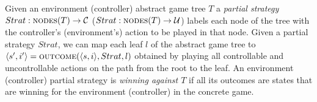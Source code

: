 Given an environment (controller) abstract game tree $T$ a \emph{partial
strategy} $Strat: \textsc{nodes}(T) \rightarrow \mathcal{C}$ ($Strat: \textsc{nodes}(T)
\rightarrow \mathcal{U}$) labels each node of the tree with the controller's
(environment's) action to be played in that node.   Given a partial strategy
$Strat$, we can map each leaf $l$ of the abstract game tree to $\langle
s',i'\rangle=\textsc{outcome}(\langle s, i\rangle, Strat, l)$ obtained by
playing all controllable and uncontrollable actions on the path from the root
to the leaf.  An environment (controller) partial strategy is \emph{winning against $T$} 
if all its outcomes are states that are winning for the environment (controller)
in the concrete game.



